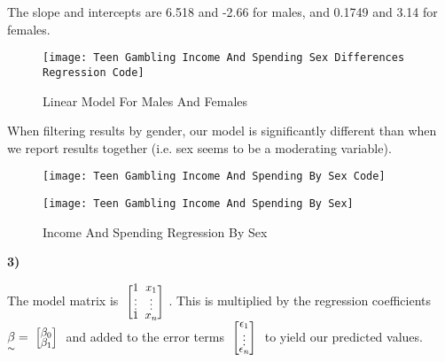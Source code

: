 \documentclass[12pt, letterpaper]{article}
\theoremstyle{definition}
\numberwithin{equation}{section}
\newcommand{\mymatrix}[1]{
	\renewcommand{\arraystretch}{0.5} 
	\setlength\arraycolsep{3pt}       
	\scalebox{0.90}{                  
		$\begin{bmatrix}
			#1
		\end{bmatrix}$
	}                   
	\renewcommand{\arraystretch}{1.0} 
	\setlength\arraycolsep{6pt}       
}
\newcommand{\+}[1]{+_{\scalebox{.375}{#1}}}
\newcommand{\1}{\mathbbm{1}}
\begin{document}
The slope and intercepts are 6.518 and -2.66 for males, and 0.1749 and 3.14 for females.

\begin{figure}[H]
	\centering
	\texttt{[image: Teen Gambling Income And Spending Sex Differences Regression Code]}
	\caption{Linear Model For Males And Females}
	\label{fig.genderdifferencescode}
\end{figure}


\noindent\textbf{}
\vspace{\baselineskip}

When filtering results by gender, our model is significantly different than when we report results together (i.e. sex seems to be a moderating variable).

\begin{figure}[H]
	\centering
	\texttt{[image: Teen Gambling Income And Spending By Sex Code]}
\end{figure}
\vspace{-0.5cm}

\begin{figure}[H]
	\centering
	\texttt{[image: Teen Gambling Income And Spending By Sex]}
	\caption{Income And Spending Regression By Sex}
	\label{fig.incomeandspendingbysex}
\end{figure}




\newpage
\noindent\textbf{3) }

\vspace{\baselineskip}
\noindent\textbf{}
\vspace{\baselineskip}

The model matrix is $\mymatrix{1&x_1\\\vdots &\vdots \\ 1 &x_n}$. This is multiplied by the regression coefficients $\underset{\sim}{\beta}=\mymatrix{\beta_0\\ \beta_1}$ and added to the error terms $\mymatrix{\epsilon_1 \\ \vdots \\ \epsilon_n}$ to yield our predicted values.
\end{document}
